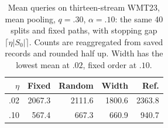 \begin{table}[t]
\centering\small
\begin{tabular}{rrrrr}
\toprule
$\eta$ & Fixed & Random & Width & Ref. \\
\midrule
.02 & 2067.3 & 2111.6 & 1800.6 & 2363.8 \\
.10 & 567.4 & 667.3 & 660.9 & 940.7 \\
\bottomrule
\end{tabular}
\caption{Mean queries on thirteen-stream WMT23, mean pooling, $q=.30$, $\alpha=.10$: the same 40 splits and fixed paths, with stopping gap $\lceil\eta|S_0|\rceil$. Counts are reaggregated from saved records and rounded half up. Width has the lowest mean at $.02$, fixed order at $.10$.}
\label{tab:tolerance-order-check}
\end{table}
